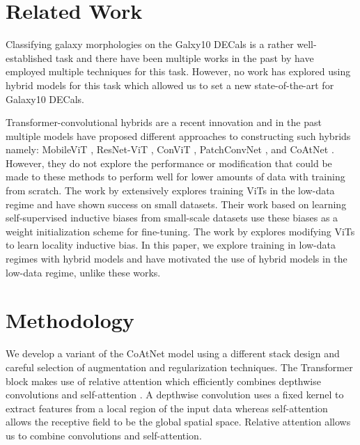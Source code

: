\documentclass{article} \usepackage{iclr2023_conference,times}
\begin{document}
\section{Related Work}
\label{Related Work}

Classifying galaxy morphologies on the Galxy10 DECals is a rather well-established task and there have been multiple works in the past by \cite{venn2019lrp2020, blancato2020decoding, chen2021classifying, 10.1007/978-3-031-23092-9_1, Hui_2022, 9990776, holandainfluence, https://doi.org/10.48550/arxiv.2211.00677, https://doi.org/10.48550/arxiv.2210.05484} have employed multiple techniques for this task. However, no work has explored using hybrid models for this task which allowed us to set a new state-of-the-art for Galaxy10 DECals.

Transformer-convolutional hybrids are a recent innovation and in the past multiple models have proposed different approaches to constructing such hybrids namely: MobileViT \citep{mehta2022mobilevit}, ResNet-ViT \citep{dosovitskiy2021an}, ConViT \citep{d2021convit}, PatchConvNet \citep{https://doi.org/10.48550/arxiv.2112.13692}, and CoAtNet \citep{dai2021coatnet}. However, they do not explore the performance or modification that could be made to these methods to perform well for lower amounts of data with training from scratch. The work by \cite{https://doi.org/10.48550/arxiv.2210.07240} extensively explores training ViTs in the low-data regime and have shown success on small datasets. Their work based on learning self-supervised inductive biases from small-scale datasets use these biases as a weight initialization scheme for fine-tuning. The work by \cite{https://doi.org/10.48550/arxiv.2112.13492} explores modifying ViTs to learn locality inductive bias. In this paper, we explore training in low-data regimes with hybrid models and have motivated the use of hybrid models in the low-data regime, unlike these works.

\section{Methodology}
\label{Methodology}

We develop a variant of the CoAtNet \citep{dai2021coatnet} model using a different stack design and careful selection of augmentation and regularization techniques. The Transformer block makes use of relative attention which efficiently combines depthwise convolutions \citep{sandler2018mobilenetv2} and self-attention \citep{vaswani2017attention}. A depthwise convolution uses a fixed kernel to extract features from a local region of the input data whereas self-attention  allows the receptive field to be the global spatial space. Relative attention allows us to combine convolutions and self-attention.
\end{document}
